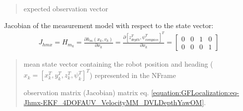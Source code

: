 \documentclass[letterpaper,10pt,english]{sphinxmanual}
\begin{document}
\begin{fulllineitems}
\begin{fulllineitems}
\begin{quote}
\begin{description}
\sphinxAtStartPar
expected observation vector

\end{description}\end{quote}

\end{fulllineitems}


\begin{fulllineitems}
\label{\detokenize{GFLocalization:EKF_4DOFAUV_InputVelocityMM_DVLDepthYawOM.EKF_4DOFAUV_InputVelocityMM_DVLDepthYawOM.Jhmx}}
\pysigstartsignatures
{}
\pysigstopsignatures
\sphinxAtStartPar
Jacobian of the measurement model with respect to the state vector:
\begin{equation}\label{equation:GFLocalization:eq-Jhmx-EKF_4DOFAUV_VelocityMM_DVLDepthYawOM}
\begin{split}J_{hmx}=H_{m_k}=\frac{\partial h_m(x_k,v_k)}{\partial x_k} = \frac{\partial [z_{depth}^T, \psi_{compass}^T]^T}{\partial x_k}
=\begin{bmatrix} 0 & 0 & 1 & 0 \\ 0 & 0 & 0 & 1 \end{bmatrix}\end{split}
\end{equation}\begin{quote}\begin{description}
\sphinxAtStartPar
{} \textendash{} mean state vector containing the robot position and heading (\(x_k=[x_k^T, y_k^T, z_k^T, \psi_k^T]^T\)) represented in the N\sphinxhyphen{}Frame

\sphinxAtStartPar
observation matrix (Jacobian) matrix eq. \eqref{equation:GFLocalization:eq-Jhmx-EKF_4DOFAUV_VelocityMM_DVLDepthYawOM}.

\end{description}\end{quote}

\end{fulllineitems}



\end{fulllineitems}
\end{document}
